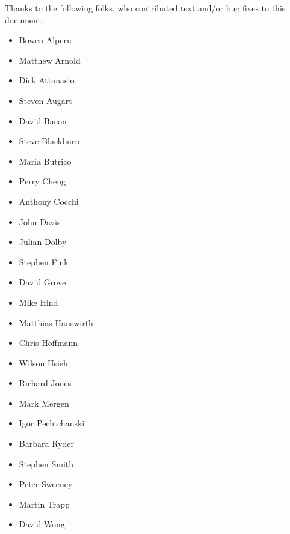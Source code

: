 Thanks to the following folks, who contributed text and/or bug fixes to
this document.

\begin{itemize}
\item Bowen Alpern
\item Matthew Arnold
\item Dick Attanasio
\item Steven Augart
\item David Bacon
\item Steve Blackburn
\item Maria Butrico
\item Perry Cheng
\item Anthony Cocchi
\item John Davis
\item Julian Dolby
\item Stephen Fink
\item David Grove
\item Mike Hind
\item Matthias Hauswirth
\item Chris Hoffmann
\item Wilson Hsieh
\item Richard Jones
\item Mark Mergen
\item Igor Pechtchanski
\item Barbara Ryder
\item Stephen Smith
\item Peter Sweeney
\item Martin Trapp
\item David Wong
\end{itemize}
